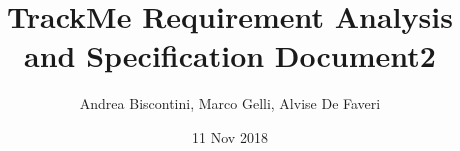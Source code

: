 
\usepackage[english]{babel}
\usepackage{natbib}
\usepackage{url}

\title{TrackMe Requirement Analysis and Specification Document}								%
\author{Andrea Biscontini, Marco Gelli, Alvise De Faveri}								%
\date{11 Nov 2018}											%

\makeatletter
\let\thetitle\@title
\let\theauthor\@author
\let\thedate\@date
\makeatother

\pagestyle{fancy}
\fancyhf{}
\cfoot{\thepage}




\title{2} 


